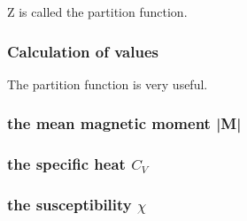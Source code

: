 Z is called the partition function. 

\subsubsection{Calculation of values}

The partition function is very useful. 

\subsubsection{the mean magnetic moment |M|}

\subsubsection{the specific heat $C_V$}

\subsubsection{the susceptibility $\chi$}



















